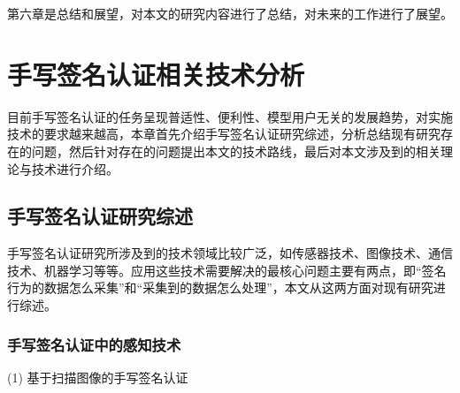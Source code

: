 第六章是总结和展望，对本文的研究内容进行了总结，对未来的工作进行了展望。

\chapter{手写签名认证相关技术分析}
\label{chap:related-work}
目前手写签名认证的任务呈现普适性、便利性、模型用户无关的发展趋势，对实施技术的要求越来越高，本章首先介绍手写签名认证研究综述，分析总结现有研究存在的问题，然后针对存在的问题提出本文的技术路线，最后对本文涉及到的相关理论与技术进行介绍。
\section{手写签名认证研究综述}
手写签名认证研究所涉及到的技术领域比较广泛，如传感器技术、图像技术、通信技术、机器学习等等。应用这些技术需要解决的最核心问题主要有两点，即“签名行为的数据怎么采集”和“采集到的数据怎么处理”，本文从这两方面对现有研究进行综述。
\subsection{手写签名认证中的感知技术}
(1) 基于扫描图像的手写签名认证

